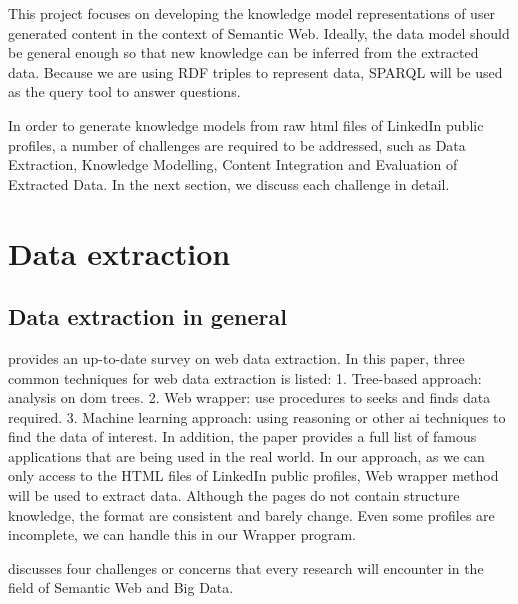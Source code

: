 This project focuses on developing the knowledge model representations of user generated content in the context of Semantic Web. Ideally, the data model should be general enough so that new knowledge can be inferred from the extracted data. Because we are using RDF triples to represent data, SPARQL will be used as the query tool to answer questions.


In order to generate knowledge models from raw \gls{html} files of LinkedIn public profiles, a number of challenges are required to be addressed, such as Data Extraction, Knowledge Modelling, Content Integration and Evaluation of Extracted Data. In the next section, we discuss each challenge in detail.

\section{Data extraction}

\subsection{Data extraction in general}


\cite{ferrara2012} provides an up-to-date survey on web data extraction. In this paper, three common techniques for web data extraction is listed: 1. Tree-based approach: analysis on \gls{dom} trees. 2. Web wrapper: use procedures to seeks and finds data required. 3. Machine learning approach: using reasoning or other \gls{ai} techniques to find the data of interest. In addition, the paper provides a full list of famous applications that are being used in the real world. In our approach, as we can only access to the HTML files of LinkedIn public profiles, Web wrapper method will be used to extract data. Although the pages do not contain structure knowledge, the format are consistent and barely change. Even some profiles are incomplete, we can handle this in our Wrapper program.

\cite{bizer2012} discusses four challenges or concerns that every research will encounter in the field of Semantic Web and Big Data.


